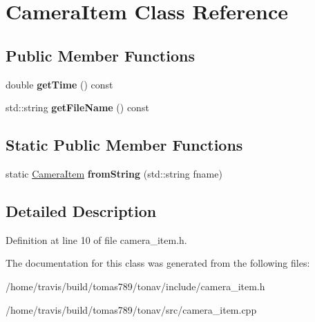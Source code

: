 \hypertarget{class_camera_item}{\section{Camera\-Item Class Reference}
\label{class_camera_item}
}
\subsection*{Public Member Functions}
\begin{DoxyCompactItemize}
\item 
\hypertarget{class_camera_item_a6227ac10298e97b4ae86371de99cd4c9}{double {\bfseries get\-Time} () const }\label{class_camera_item_a6227ac10298e97b4ae86371de99cd4c9}

\item 
\hypertarget{class_camera_item_a6e19e5bdbfc691fb8abc4e94ef43f05e}{std\-::string {\bfseries get\-File\-Name} () const }\label{class_camera_item_a6e19e5bdbfc691fb8abc4e94ef43f05e}

\end{DoxyCompactItemize}
\subsection*{Static Public Member Functions}
\begin{DoxyCompactItemize}
\item 
\hypertarget{class_camera_item_a4cccf1e169a05288c47ecf232afb2086}{static \hyperlink{class_camera_item}{Camera\-Item} {\bfseries from\-String} (std\-::string fname)}\label{class_camera_item_a4cccf1e169a05288c47ecf232afb2086}

\end{DoxyCompactItemize}


\subsection{Detailed Description}


Definition at line 10 of file camera\-\_\-item.\-h.



The documentation for this class was generated from the following files\-:\begin{DoxyCompactItemize}
\item 
/home/travis/build/tomas789/tonav/include/camera\-\_\-item.\-h\item 
/home/travis/build/tomas789/tonav/src/camera\-\_\-item.\-cpp\end{DoxyCompactItemize}
